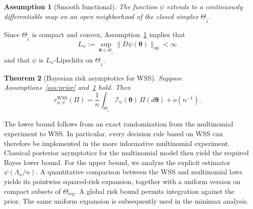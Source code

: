 \documentclass{article}
\newtheorem{theorem}{Theorem}[section]
\newtheorem{assumption}[theorem]{Assumption}
\theoremstyle{named}
\theoremstyle{named1}
\newcommand{\E}{\mathbb{E}}
\newcommand{\WSS}{\mathrm{WSS}}
\newcommand{\btheta}{\boldsymbol{\theta}}
\newcommand{\cI}{\mathcal{I}}
\theoremstyle{plain}
\theoremstyle{remark}
\begin{document}
\begin{assumption}[Smooth functional]
\label{ass:psi}
The function \(\psi\) extends to a continuously differentiable map on
an open neighborhood of the closed simplex \(\Theta_{\downarrow}\).
\end{assumption}

Since \(\Theta_{\downarrow}\) is compact and convex,
Assumption~\ref{ass:psi} implies that
\begin{equation}
    L_\psi
    :=\sup_{\btheta\in\Theta_{\downarrow}}
      \|D\psi(\btheta)\|_{\mathrm{op}}<\infty
\label{eq:psi-lipschitz-constant}
\end{equation}
and that \(\psi\) is \(L_\psi\)-Lipschitz on
\(\Theta_{\downarrow}\).

\begin{theorem}[Bayesian risk asymptotics for WSS]
\label{thm:WSS_Bayes_asymp}
Suppose Assumptions~\ref{ass:prior} and~\ref{ass:psi} hold. Then
\begin{equation}
    r_{n,\psi}^{\WSS}(\Pi)
    =\frac1n
      \int_{\Theta_{\downarrow}}
      \cI_\psi(\btheta)\,\Pi(d\btheta)
      +o(n^{-1}).
\label{eq:wss-bayes-asymptotics}
\end{equation}
\end{theorem}

The lower bound follows from an exact randomization from the multinomial
experiment to WSS. In particular, every decision rule based on WSS can therefore be
implemented in the more informative multinomial experiment. Classical
posterior asymptotics for the multinomial model then yield the required
Bayes lower bound. For the upper bound, we analyze the explicit estimator
$\psi(\Lambda_n/n)$. A quantitative comparison between the WSS and
multinomial laws yields its pointwise squared-risk expansion, together with
a uniform version on compact subsets of $\Theta_{\mathrm{reg}}$. A global
risk bound permits integration against the prior. The same uniform
expansion is subsequently used in the minimax analysis.
\end{document}
